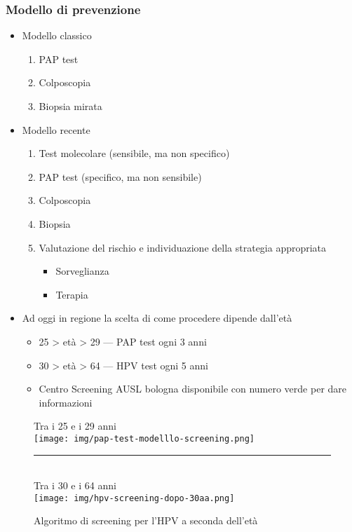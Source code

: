 \documentclass[italian,]{article}
\providecommand{\tightlist}{%
  \setlength{\itemsep}{0pt}\setlength{\parskip}{0pt}}
\begin{document}
\hypertarget{modello-di-prevenzione}{%
\subsubsection{Modello di prevenzione}\label{modello-di-prevenzione}}

\begin{itemize}
\tightlist
\item
  Modello classico

  \begin{enumerate}
  \def\labelenumi{\arabic{enumi}.}
  \tightlist
  \item
    PAP test
  \item
    Colposcopia
  \item
    Biopsia mirata
  \end{enumerate}
\item
  Modello recente

  \begin{enumerate}
  \def\labelenumi{\arabic{enumi}.}
  \tightlist
  \item
    Test molecolare (sensibile, ma non specifico)
  \item
    PAP test (specifico, ma non sensibile)
  \item
    Colposcopia
  \item
    Biopsia
  \item
    Valutazione del rischio e individuazione della strategia appropriata

    \begin{itemize}
    \tightlist
    \item
      Sorveglianza
    \item
      Terapia
    \end{itemize}
  \end{enumerate}
\item
  Ad oggi in regione la scelta di come procedere dipende dall'età

  \begin{itemize}
  \tightlist
  \item
    25 \textgreater{} età \textgreater{} 29 --- PAP test ogni 3 anni
  \item
    30 \textgreater{} età \textgreater{} 64 --- HPV test ogni 5 anni
  \item
    Centro Screening AUSL bologna disponibile con numero verde per dare
    informazioni
  \end{itemize}
\end{itemize}

\begin{figure}
\centering
Tra i 25 e i 29 anni\\
\texttt{[image: img/pap-test-modelllo-screening.png]}\\
\rule{0.5\linewidth}{\linethickness}\\
Tra i 30 e i 64 anni\\
\texttt{[image: img/hpv-screening-dopo-30aa.png]}
\caption{Algoritmo di screening per l'HPV a seconda dell'età}
\end{figure}
\end{document}
